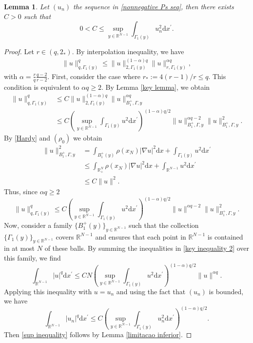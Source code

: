 \documentclass[12pt,reqno]{amsart}
\newtheorem{lemma}[theorem]{Lemma}
\begin{document}
\begin{lemma}\label{sup}Let $(u_n)$ the sequence in \eqref{nonnegative Ps seq}, then there exists $C>0$ such that 
\begin{equation}\label{sup inequality}
    0<C \leq \sup_{y \in \mathds{R}^{N-1}}\int_{ \Gamma_1(y)}u_n^2\mathrm{d}x^\prime.
\end{equation}
\end{lemma}

\begin{proof}Let $r\in (q,2_\ast)$. By interpolation inequality, we have
\begin{align*}
    \|u\|_{q, \Gamma_1(y)}^q \leq \|u\|_{2, \Gamma_1(y)}^{(1-\alpha)q}\|u\|_{r, \Gamma_1(y)}^{\alpha q},
\end{align*}
with $\alpha= \frac{r}{q}\frac{q-2}{r-2}$. First, consider the case where $r_\ast:=4(r-1)/r\leq q$. This condition is equivalent to $\alpha q\geq 2$. By Lemma \ref{key lemma}, we obtain
\begin{align*}
     \|u\|_{q, \Gamma_1(y)}^q &\leq C \|u\|_{2, \Gamma_1(y)}^{(1-\alpha)q}\|u\|_{B_1^+,\Gamma,y}^{\alpha q}\\
     &\leq C \left(\sup_{y \in \mathds{R}^{N-1}}\int_{ \Gamma_1(y)}u^2\mathrm{d}x^\prime\right)^{(1-\alpha)q/2}\|u\|_{B_1^+,\Gamma,y}^{\alpha q-2}\|u\|_{B_1^+,\Gamma,y}^2.
\end{align*}
By \eqref{Hardy} and $(\rho_0)$ we obtain
\begin{align*}
    \|u\|_{B_1^+,\Gamma, y}^2&= \int_{B_1^+(y)}\rho(x_N)|\nabla u|^2\mathrm{d}x+\int_{ \Gamma_1(y)}u^2\mathrm{d}x^\prime\\
    &\leq \int_{\mathds{R}^N_+}\rho(x_N)|\nabla u|^2\mathrm{d}x+\int_{\mathds{R}^{N-1}}u^2\mathrm{d}x^\prime\\
    &\leq C \|u\|  ^2.
\end{align*}
Thus, since $\alpha q\geq 2$
\begin{equation}\label{key inequality 2}
    \|u\|_{q, \Gamma_1(y)}^q \leq C \left(\sup_{y \in \mathds{R}^{N-1}}\int_{ \Gamma_1(y)}u^2\mathrm{d}x^\prime\right)^{(1-\alpha)q/2} \|u\|  ^{\alpha q-2}\|u\|_{B_1^+,\Gamma,y}^2.
\end{equation}
Now, consider a family $\{B_1^+(y)\}_{y \in \mathds{R}^{N-1}}$ such that the collection $\{ \Gamma_1(y)\}_{y \in \mathds{R}^{N-1}}$ covers $\mathds{R}^{N-1}$ and ensures that each point in $\mathds{R}^{N-1}$ is contained in at most $N$ of these balls. By summing the inequalities in \eqref{key inequality 2} over this family, we find
\begin{equation}\label{key inequality 3}
     \int_{\mathds{R}^{N-1}}|u|^q\mathrm{d}x^\prime \leq CN \left(\sup_{y \in \mathds{R}^{N-1}}\int_{ \Gamma_1(y)}u^2\mathrm{d}x^\prime\right)^{(1-\alpha)q/2} \|u\|  ^{\alpha q}.
\end{equation}
Applying this inequality with $u=u_n$ and using the fact that $(u_n)$ is bounded, we have
\begin{equation*}
     \int_{\mathds{R}^{N-1}}|u_n|^q\mathrm{d}x^\prime \leq C \left(\sup_{y \in \mathds{R}^{N-1}}\int_{ \Gamma_1(y)}u_n^2\mathrm{d}x^\prime\right)^{(1-\alpha)q/2}.
\end{equation*}
Then \eqref{sup inequality} follows by Lemma \ref{limitacao inferior}.


\end{proof}
\end{document}

